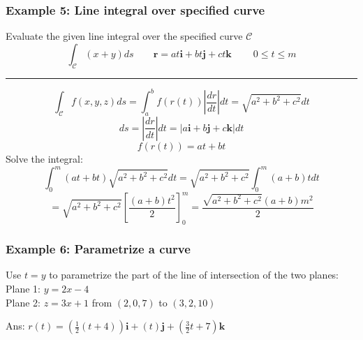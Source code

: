 \subsubsection{Example 5: Line integral over specified curve}
Evaluate the given line integral over the specified curve $\mathcal{C}$
$$\textstyle\int_{\mathcal{C}}(x+y)ds\qquad \mathbf{r}=a t\mathbf{i}+b t\mathbf{j}+c t\mathbf{k}\qquad\ 0\leq t\leq m$$

\rule{\textwidth}{1pt}

$$\int_{\mathcal{C}}f(x,y,z)ds=\int_a^bf(r(t))\left|\frac{dr}{dt}\right|dt=\sqrt{a^2+b^2+c^2}dt$$
$$ds=\left|\frac{dr}{dt}\right|dt=|a\mathbf{i}+b\mathbf{j}+c\mathbf{k}|dt$$
$$f(r(t))=at+bt$$
Solve the integral:
$$\int_0^m(at+bt)\sqrt{a^2+b^2+c^2}dt=\sqrt{a^2+b^2+c^2}\int_0^m(a+b)tdt$$
$$=\sqrt{a^2+b^2+c^2}\left[\frac{(a+b)t^2}{2}\right]_0^m=\frac{\sqrt{a^2+b^2+c^2}(a+b)m^2}{2}$$
\subsubsection{Example 6: Parametrize a curve}
Use $t=y$ to parametrize the part of the line of intersection of the two planes:\\
Plane 1: $y=2x-4$\\
Plane 2: $z=3x+1$ from $(2,0,7)$ to $(3,2,10)$

Ans: $r(t)=\left(\frac{1}{2}(t+4)\right)\mathbf{i}+(t)\mathbf{j}+\left(\frac{3}{2}t+7\right)\mathbf{k}$
